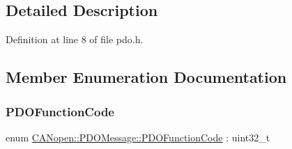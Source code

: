 \subsection{Detailed Description}


Definition at line 8 of file pdo.\+h.



\subsection{Member Enumeration Documentation}
\mbox{\label{class_c_a_nopen_1_1_p_d_o_message_ab46579ce08cec30d0bc60428053cb39f}} 
\subsubsection{\texorpdfstring{P\+D\+O\+Function\+Code}{PDOFunctionCode}}
{\footnotesize\ttfamily enum \hyperlink{class_c_a_nopen_1_1_p_d_o_message_ab46579ce08cec30d0bc60428053cb39f}{C\+A\+Nopen\+::\+P\+D\+O\+Message\+::\+P\+D\+O\+Function\+Code} \+: uint32\+\_\+t}

